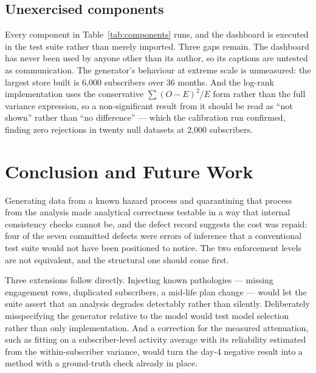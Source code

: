 \documentclass[conference]{IEEEtran}
\begin{document}
\subsection{Unexercised components}

Every component in Table~\ref{tab:components} runs, and the dashboard is
executed in the test suite rather than merely imported. Three gaps remain. The
dashboard has never been used by anyone other than its author, so its captions
are untested as communication. The generator's behaviour at extreme scale is
unmeasured: the largest store built is 6{,}000 subscribers over 36 months. And
the log-rank implementation uses the conservative $\sum(O-E)^2/E$ form rather
than the full variance expression, so a non-significant result from it should be
read as ``not shown'' rather than ``no difference'' --- which the calibration run
confirmed, finding zero rejections in twenty null datasets at 2{,}000
subscribers.

\section{Conclusion and Future Work}

Generating data from a known hazard process and quarantining that process from
the analysis made analytical correctness testable in a way that internal
consistency checks cannot be, and the defect record suggests the cost was
repaid: four of the seven committed defects were errors of inference that a
conventional test suite would not have been positioned to notice. The two
enforcement levels are not equivalent, and the structural one should come first.

Three extensions follow directly. Injecting known pathologies --- missing
engagement rows, duplicated subscribers, a mid-life plan change --- would let
the suite assert that an analysis degrades detectably rather than silently.
Deliberately misspecifying the generator relative to the model would test model
selection rather than only implementation. And a correction for the measured
attenuation, such as fitting on a subscriber-level activity average with its
reliability estimated from the within-subscriber variance, would turn the day-4
negative result into a method with a ground-truth check already in place.
\end{document}
